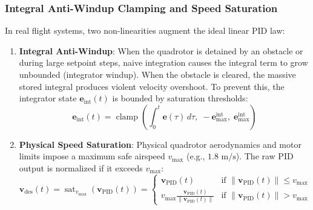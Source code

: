\documentclass[11pt,a4paper]{article}
\begin{document}
\subsubsection{Integral Anti-Windup Clamping and Speed Saturation}
In real flight systems, two non-linearities augment the ideal linear PID law:
\begin{enumerate}
    \item \textbf{Integral Anti-Windup}: When the quadrotor is detained by an obstacle or during large setpoint steps, naive integration causes the integral term to grow unbounded (integrator windup). When the obstacle is cleared, the massive stored integral produces violent velocity overshoot. To prevent this, the integrator state $\mathbf{e}_{\mathrm{int}}(t)$ is bounded by saturation thresholds:
    \begin{equation}
    \mathbf{e}_{\mathrm{int}}(t) = \operatorname{clamp}\left( \int_{0}^t \mathbf{e}(\tau) \, d\tau, \; -\mathbf{e}_{\max}^{\mathrm{int}}, \; \mathbf{e}_{\max}^{\mathrm{int}} \right)
    \end{equation}
    \item \textbf{Physical Speed Saturation}: Physical quadrotor aerodynamics and motor limits impose a maximum safe airspeed $v_{\max}$ (e.g., $1.8\text{ m/s}$). The raw PID output is normalized if it exceeds $v_{\max}$:
    \begin{equation}
    \mathbf{v}_{\mathrm{des}}(t) = \operatorname{sat}_{v_{\max}}(\mathbf{v}_{\mathrm{PID}}(t)) = 
    \begin{cases}
    \mathbf{v}_{\mathrm{PID}}(t) & \text{if } \|\mathbf{v}_{\mathrm{PID}}(t)\| \le v_{\max} \\
    v_{\max} \frac{\mathbf{v}_{\mathrm{PID}}(t)}{\|\mathbf{v}_{\mathrm{PID}}(t)\|} & \text{if } \|\mathbf{v}_{\mathrm{PID}}(t)\| > v_{\max}
    \end{cases}
    \label{eq:v_des_saturated}
    \end{equation}
\end{enumerate}
\end{document}
